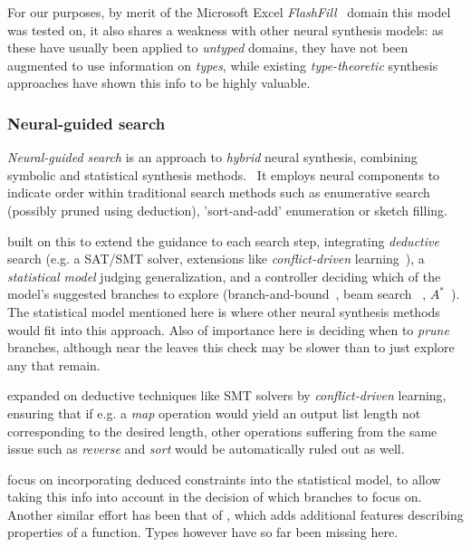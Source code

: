 \documentclass{article}
\begin{document}
For our purposes, by merit of the Microsoft Excel \emph{FlashFill}~\citep{prose} domain this model was tested on,
it also shares a weakness with other neural synthesis models:
as these have usually been applied to \emph{untyped} domains,
they have not been augmented to use information on \emph{types},
while existing \emph{type-theoretic} synthesis approaches have shown this info to be highly valuable.

\subsubsection{Neural-guided search} \label{sec:ngs}

\emph{Neural-guided search} is an approach to \emph{hybrid} neural synthesis,
combining symbolic and statistical synthesis methods.~\citep{nps}
It employs neural components to indicate order within traditional search methods
such as enumerative search (possibly pruned using deduction),
'sort-and-add' enumeration or sketch filling.~\citep{deepcoder}

\citet{kalyan2018neural} built on this to extend the guidance to each search step,
integrating \emph{deductive} search (e.g. a SAT/SMT solver, extensions
like \emph{conflict-driven} learning~\citep{feng2018program}),
a \emph{statistical model} judging generalization,
and a controller deciding which of the model's suggested branches
to explore (branch-and-bound~\citep{kalyan2018neural}, beam search%
~\citep{polosukhin2018neural}, $A^{*}$~\citep{lee2018accelerating}).
The statistical model mentioned here is where other
neural synthesis methods would fit into this approach.
Also of importance here is deciding when to \emph{prune} branches,
although near the leaves this check may be slower
than to just explore any that remain.~\citep{polozov}

\citet{feng2018program} expanded on deductive techniques
like SMT solvers by \emph{conflict-driven} learning,
ensuring that if e.g. a \emph{map} operation would yield an
output list length not corresponding to the desired length,
other operations suffering from the same issue such as
\emph{reverse} and \emph{sort} would be automatically ruled out as well.

\citet{zhang2018leveraging} focus on incorporating deduced constraints
into the statistical model, to allow taking this info into account
in the decision of which branches to focus on.
Another similar effort has been that of \citet{odena2020learning},
which adds additional features describing properties of a function.
Types however have so far been missing here.
\end{document}
